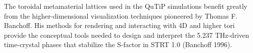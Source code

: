 
The toroidal metamaterial lattices used in the QuTiP simulations benefit greatly from the higher-dimensional visualization techniques pioneered by Thomas F. Banchoff. His methods for rendering and interacting with 4D and higher tori provide the conceptual tools needed to design and interpret the 5.237 THz-driven time-crystal phases that stabilize the S-factor in STRT 1.0 (Banchoff 1996).

